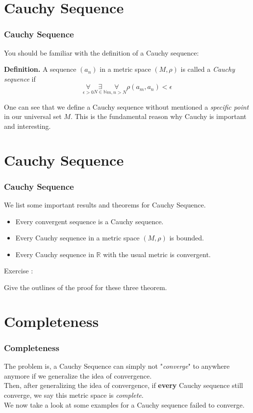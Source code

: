 \documentclass[12pt, t]{beamer}
\renewcommand{\emph}[1]{{\color{Turquoise3}\textsl{#1}}}
\begin{document}
\section{Cauchy Sequence}
\begin{frame}
    \frametitle{Cauchy Sequence}

You should be familiar with the definition of a Cauchy sequence:
\vspace{1em}

\textbf{Definition.} A sequence $(a_n)$ in a metric space $(M,\rho)$ is called a \emph{Cauchy sequence} if 
\begin{equation*}
    \underset{\epsilon>0}{\forall}\underset{N\in\mathbb{N}}{\exists}\underset{m,n>N}{\forall}\rho(a_m,a_n)<\epsilon
\end{equation*}

One can see that we define a Cauchy sequence without mentioned a \emph{specific point} in our universal set $M$. This is the fundamental reason why Cauchy is important and 
interesting.

\end{frame}


\section{Cauchy Sequence}
\begin{frame}
    \frametitle{Cauchy Sequence}
We list some important results and theorems for Cauchy Sequence.
\begin{itemize}
    \item Every convergent sequence is a Cauchy sequence.
    \item Every Cauchy sequence in a metric space $(M,\rho)$ is bounded.
    \item Every Cauchy sequence in $\mathbb{R}$ with the usual metric is convergent.
\end{itemize}

\vspace{1em}

Exercise : \\
\begin{center}
    Give the outlines of the proof for these three theorem.
\end{center}

\end{frame}


\section{Completeness}
\begin{frame}
    \frametitle{Completeness}
The problem is, a Cauchy Sequence can simply not "\emph{converge}" to anywhere anymore if we generalize the idea of convergence.\\
\vspace{0.5em}
Then, after generalizing the idea of convergence, if \textbf{every} Cauchy sequence still converge, we say this metric space is 
\emph{complete}.\\
\vspace{0.5em}
We now take a look at some examples for a Cauchy sequence failed to converge.

\end{frame}
\end{document}
